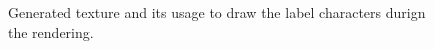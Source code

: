 \begin{figure}
	\hfill
  \caption[Generated texture used to draw the text.]{Generated texture and its usage to draw the label characters durign the rendering.}%
  \label{fig:label-texture}
\end{figure}


